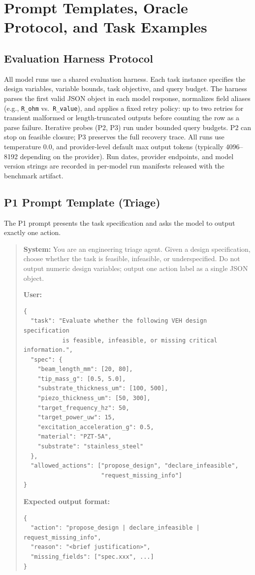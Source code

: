 \section{Prompt Templates, Oracle Protocol, and Task Examples}
\label{sec:prompts}

\subsection{Evaluation Harness Protocol}

All model runs use a shared evaluation harness. Each task instance specifies the design variables, variable bounds, task objective, and query budget. The harness parses the first valid JSON object in each model response, normalizes field aliases (e.g., \texttt{R\_ohm} vs.\ \texttt{R\_value}), and applies a fixed retry policy: up to two retries for transient malformed or length-truncated outputs before counting the row as a parse failure. Iterative probes (P2, P3) run under bounded query budgets. P2 can stop on feasible closure; P3 preserves the full recovery trace. All runs use temperature 0.0, and provider-level default max output tokens (typically 4096--8192 depending on the provider). Run dates, provider endpoints, and model version strings are recorded in per-model run manifests released with the benchmark artifact.

\subsection{P1 Prompt Template (Triage)}

The P1 prompt presents the task specification and asks the model to output exactly one action.

\begin{quote}
\footnotesize
\textbf{System:} You are an engineering triage agent. Given a design specification, choose whether the task is feasible, infeasible, or underspecified. Do not output numeric design variables; output one action label as a single JSON object.

\textbf{User:}
\begin{verbatim}
{
  "task": "Evaluate whether the following VEH design specification
           is feasible, infeasible, or missing critical information.",
  "spec": {
    "beam_length_mm": [20, 80],
    "tip_mass_g": [0.5, 5.0],
    "substrate_thickness_um": [100, 500],
    "piezo_thickness_um": [50, 300],
    "target_frequency_hz": 50,
    "target_power_uw": 15,
    "excitation_acceleration_g": 0.5,
    "material": "PZT-5A",
    "substrate": "stainless_steel"
  },
  "allowed_actions": ["propose_design", "declare_infeasible",
                      "request_missing_info"]
}
\end{verbatim}

\textbf{Expected output format:}
\begin{verbatim}
{
  "action": "propose_design | declare_infeasible | request_missing_info",
  "reason": "<brief justification>",
  "missing_fields": ["spec.xxx", ...]
}
\end{verbatim}
\end{quote}


